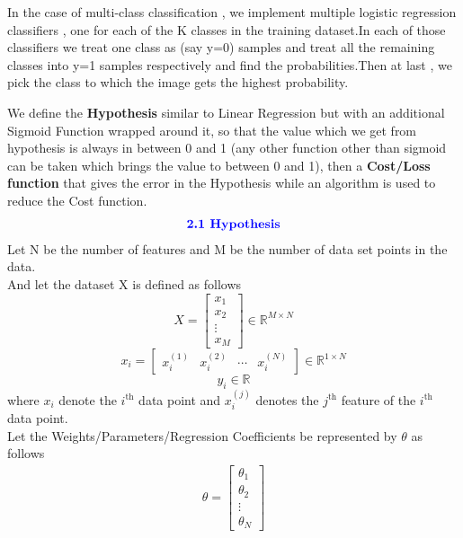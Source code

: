 \documentclass[12pt,a4paper]{article}
\begin{document}
{In the case of multi-class classification , we implement multiple logistic regression classifiers , one for each of the K classes in the training dataset.In each of those classifiers we treat one class as (say y=0) samples and treat all the remaining classes into y=1 samples respectively and find the probabilities.Then at last , we pick the class to which the image gets the highest probability.


We define the  \textbf{Hypothesis} similar to Linear Regression but with an additional Sigmoid Function wrapped around it, so that the value which we get from hypothesis is always in between 0 and 1 (any other function other than sigmoid can be taken which brings the value to between 0 and 1), then a \textbf{Cost/Loss function} that gives the error in the Hypothesis while an algorithm is used to reduce the Cost function.
\begin{align*}
    \textcolor{blue}{\text{{\textbf{2.1 Hypothesis}}}}
\end{align*}
Let N be the number of features and M be the number of data set points in the data.\\ And let the dataset X is defined as follows 
\begin{equation*}
  X = \begin{bmatrix} 
x_1\\x_2\\\vdots\\x_M 
\end{bmatrix}\in \mathbb{R}^{M \times N}
\end{equation*}
\begin{equation*}
x_i = \begin{bmatrix} x_{i}^{(1)}&x_{i}^{(2)}& \cdots & x_{i}^{(N)}\end{bmatrix} \in \mathbb{R}^{1\times N}
\end{equation*}
\begin{equation*}
y_i \in \mathbb{R}
\end{equation*}
where $x_i$ denote the $i^\text{th}$ data point and $x_{i}^{(j)}$ denotes the $j^\text{th}$ feature of the $i^\text{th}$ data point.\\
Let the Weights/Parameters/Regression Coefficients be represented by $\theta$ as follows
\begin{align*}
    \theta = \begin{bmatrix}
\theta_1\\\theta_2\\\vdots\\\theta_N
\end{bmatrix}

\end{align*}}
\end{document}
